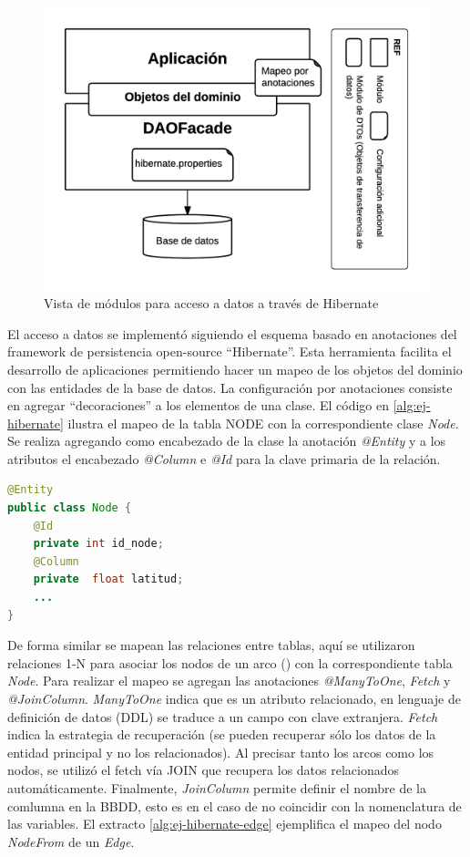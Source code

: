 \begin{figure}[!htp]
	\centering
	\includegraphics[scale=0.9]{images/hibernate.png}
	\captionsetup{width=0.7\textwidth}
	\caption{Vista de módulos para acceso a datos a través de Hibernate}
    \label{fig:hibernate}
\end{figure}
 
 El acceso a datos se implementó siguiendo el esquema basado en anotaciones del framework de persistencia open-source ``Hibernate''. Esta herramienta facilita el desarrollo de aplicaciones permitiendo hacer un mapeo de los objetos del dominio con las entidades de la base de datos. La configuración por anotaciones consiste en agregar ``decoraciones'' a los elementos de una clase. El código en \ref{alg:ej-hibernate} ilustra el mapeo de la tabla NODE con la correspondiente clase \textit{Node}. Se realiza agregando como encabezado de la clase la anotación \textit{@Entity} y a los atributos el encabezado \textit{@Column} e \textit{@Id} para la clave primaria de la relación.

\begin{lstlisting}[language=Java, caption=Mapeo objeto-relacional de la entidad Node en Hibernate, label=alg:ej-hibernate]
@Entity
public class Node {
    @Id
    private int id_node;
    @Column
    private  float latitud;
    ...
}
\end{lstlisting}

De forma similar se mapean las relaciones entre tablas, aquí se utilizaron relaciones 1-N para asociar los nodos de un arco () con la correspondiente tabla \textit{Node}. Para realizar el mapeo se agregan las anotaciones \textit{@ManyToOne}, \textit{Fetch} y \textit{@JoinColumn}. \textit{ManyToOne} indica que es un atributo relacionado, en lenguaje de definición de datos (DDL) se traduce a un campo con clave extranjera. \textit{Fetch} indica la estrategia de recuperación (se pueden recuperar sólo los datos de la entidad principal y no los relacionados). Al precisar tanto los arcos como los nodos, se utilizó el fetch vía JOIN que recupera los datos relacionados automáticamente. Finalmente, \textit{JoinColumn} permite definir el nombre de la comlumna en la BBDD, esto es en el caso de no coincidir con la nomenclatura de las variables. El extracto \ref{alg:ej-hibernate-edge} ejemplifica el mapeo del nodo \textit{NodeFrom} de un \textit{Edge}.

